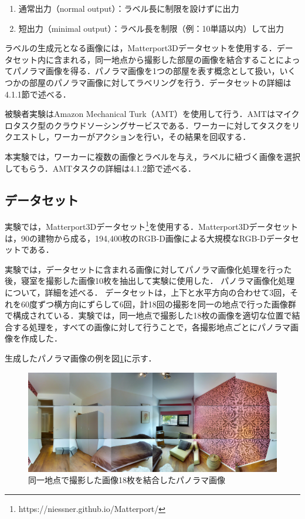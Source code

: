 \documentclass[a4paper,11pt]{jreport}
\begin{document}
\begin{enumerate}
    \item 通常出力（normal output）：ラベル長に制限を設けずに出力
    \item 短出力（minimal output）：ラベル長を制限（例：10単語以内）して出力
\end{enumerate}

ラベルの生成元となる画像には，Matterport3Dデータセットを使用する．データセット内に含まれる，同一地点から撮影した部屋の画像を結合することによってパノラマ画像を得る．パノラマ画像を1つの部屋を表す概念として扱い，いくつかの部屋のパノラマ画像に対してラベリングを行う．データセットの詳細は4.1.1節で述べる．

被験者実験はAmazon Mechanical Turk（AMT）を使用して行う．AMTはマイクロタスク型のクラウドソーシングサービスである．ワーカーに対してタスクをリクエストし，ワーカーがアクションを行い，その結果を回収する．

本実験では，ワーカーに複数の画像とラベルを与え，ラベルに紐づく画像を選択してもらう．AMTタスクの詳細は4.1.2節で述べる．

\subsection{データセット}

実験では，Matterport3Dデータセット\footnote{https://niessner.github.io/Matterport/}を使用する．Matterport3Dデータセットは，90の建物から成る，194,400枚のRGB-D画像による大規模なRGB-Dデータセットである．

実験では，データセットに含まれる画像に対してパノラマ画像化処理を行った後，寝室を撮影した画像10枚を抽出して実験に使用した．
パノラマ画像化処理について，詳細を述べる．
データセットは，上下と水平方向の合わせて3回，それを60度ずつ横方向にずらして6回，計18回の撮影を同一の地点で行った画像群で構成されている．実験では，同一地点で撮影した18枚の画像を適切な位置で結合する処理を，すべての画像に対して行うことで，各撮影地点ごとにパノラマ画像を作成した．

生成したパノラマ画像の例を図\ref{fig:panorama_example}に示す．

\begin{figure}[H]
  \centering
  \includegraphics[width=\linewidth]{figures/panorama.jpeg}
  \caption{同一地点で撮影した画像18枚を結合したパノラマ画像}
  \label{fig:panorama_example}
\end{figure}
\end{document}
